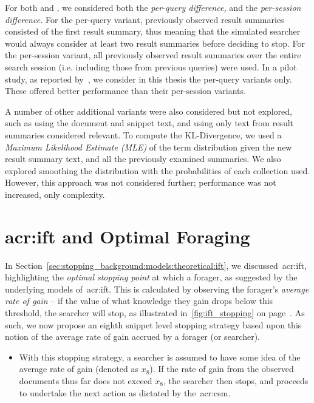 For both  and , we considered both the \emph{per-query difference,} and the \emph{per-session difference.} For the per-query variant, previously observed result summaries consisted of the first result summary, thus meaning that the simulated searcher would always consider at least two result summaries before deciding to stop. For the per-session variant, all previously observed result summaries over the entire search session (i.e. including those from previous queries) were used. In a pilot study, as reported by~\cite{maxwell2015initial_stopping}, we consider in this thesis the per-query variants only. These offered better performance than their per-session variants.

A number of other additional variants were also considered but not explored, such as using the document and snippet text, and using only text from result summaries considered relevant. To compute the KL-Divergence, we used a \emph{Maximum Likelihood Estimate (MLE)} of the term distribution given the new result summary text, and all the previously examined summaries. We also explored smoothing the distribution with the probabilities of each collection used. However, this approach was not considered further; performance was not increased, only complexity.

\section{\gls{acr:ift} and Optimal Foraging}
In Section~\ref{sec:stopping_background:models:theoretical:ift}, we discussed~\gls{acr:ift}, highlighting the \emph{optimal stopping point} at which a forager, as suggested by the underlying models of~\gls{acr:ift}. This is calculated by observing the forager's \emph{average rate of gain} -- if the value of what knowledge they gain drops below this threshold, the searcher will stop, as illustrated in~\ref{fig:ift_stopping} on page~\pageref{fig:ift_stopping}. As such, we now propose an eighth snippet level stopping strategy based upon this notion of the average rate of gain accrued by a forager (or searcher).

\begin{itemize}
    \item{ With this stopping strategy, a searcher is assumed to have some idea of the average rate of gain (denoted as $x_8$). If the rate of gain from the observed documents thus far does not exceed $x_8$, the searcher then stops, and proceeds to undertake the next action as dictated by the~\gls{acr:csm}.}
\end{itemize}

